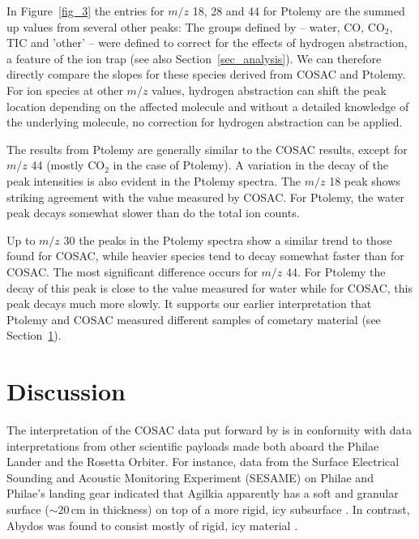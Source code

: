 \documentclass{aa}
\begin{document}
In Figure~\ref{fig_3} the entries for $m/z$ 18, 28 and 44 for Ptolemy are the summed up values from 
several other peaks: The groups defined by \citet{morse2015} -- water, CO, 
$\mathrm{CO_2}$, TIC and 'other' --
were defined to correct for the effects of hydrogen abstraction, a feature of the ion trap 
(see also Section~\ref{sec_analysis}).  We can therefore directly compare the slopes for these species 
derived from COSAC and Ptolemy. 
For ion species at other $m/z$ values, hydrogen abstraction can shift the peak location depending on 
the affected molecule and without a detailed knowledge of the underlying molecule, no correction for hydrogen abstraction can be applied. 

The results from Ptolemy are generally similar to the COSAC results, except for $m/z$ 44 (mostly $\mathrm{CO_2}$ in the 
case of Ptolemy). A variation in the decay of the peak intensities is also evident in the Ptolemy spectra. 
The $m/z$ 18  peak shows striking agreement with the value measured by COSAC. For Ptolemy, the water peak decays somewhat slower than do the total ion counts. 

Up to $m/z$ 30 the peaks in the Ptolemy spectra show a similar trend to those found for COSAC, while heavier species tend to decay somewhat faster than for COSAC. The most significant difference occurs for $m/z$ 44. For Ptolemy the decay of this peak is close to the value measured for water while for COSAC, this peak decays much more slowly.  It supports our earlier 
interpretation that Ptolemy and COSAC measured different samples of cometary material (see Section~\ref{sec_discussion}).


\section{Discussion}

\label{sec_discussion}

The interpretation of the COSAC data put forward by \citet{goesmann2015} 
is in conformity with data interpretations from other scientific payloads made both aboard the Philae Lander 
and the Rosetta Orbiter. For instance, data from the Surface Electrical Sounding and Acoustic Monitoring Experiment (SESAME) on 
Philae  and Philae's landing gear indicated that Agilkia apparently has a soft and granular surface ($\sim 20\,\mathrm{cm}$ in thickness) on top of a more rigid, icy subsurface  \citep{roll2016a,roll2016b}. 
In contrast, Abydos was found to  consist mostly of rigid, icy material \citep{biele2015,spohn2015}. 
\end{document}
